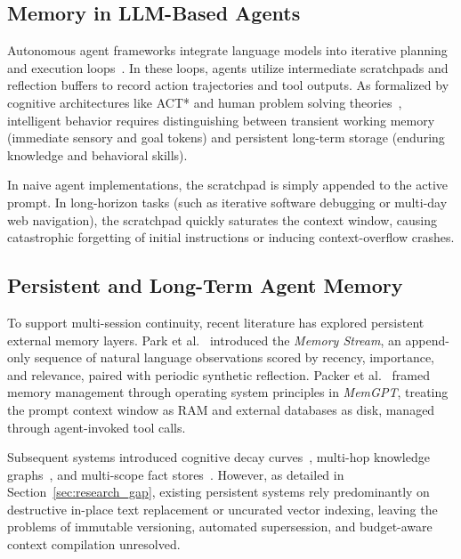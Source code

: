 \subsection{Memory in LLM-Based Agents}
Autonomous agent frameworks integrate language models into iterative planning and execution loops~\cite{yao2022react,shinn2023reflexion}. In these loops, agents utilize intermediate scratchpads and reflection buffers to record action trajectories and tool outputs. As formalized by cognitive architectures like ACT* and human problem solving theories~\cite{newell1972human}, intelligent behavior requires distinguishing between transient working memory (immediate sensory and goal tokens) and persistent long-term storage (enduring knowledge and behavioral skills).

In naive agent implementations, the scratchpad is simply appended to the active prompt. In long-horizon tasks (such as iterative software debugging or multi-day web navigation), the scratchpad quickly saturates the context window, causing catastrophic forgetting of initial instructions or inducing context-overflow crashes.

\subsection{Persistent and Long-Term Agent Memory}
To support multi-session continuity, recent literature has explored persistent external memory layers. Park et al.~\cite{park2023generative} introduced the \textit{Memory Stream}, an append-only sequence of natural language observations scored by recency, importance, and relevance, paired with periodic synthetic reflection. Packer et al.~\cite{packer2023memgpt} framed memory management through operating system principles in \textit{MemGPT}, treating the prompt context window as RAM and external databases as disk, managed through agent-invoked tool calls.

Subsequent systems introduced cognitive decay curves~\cite{zhong2023memorybank}, multi-hop knowledge graphs~\cite{gutierrez2024hipporag,edge2024graphrag}, and multi-scope fact stores~\cite{deshmukh2024mem0}. However, as detailed in Section~\ref{sec:research_gap}, existing persistent systems rely predominantly on destructive in-place text replacement or uncurated vector indexing, leaving the problems of immutable versioning, automated supersession, and budget-aware context compilation unresolved.

